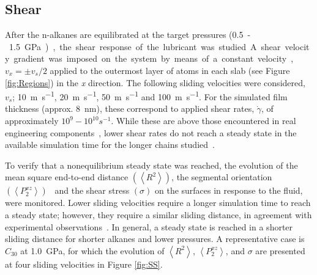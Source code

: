 \documentclass[5p]{elsarticle}
\begin{document}
\subsection{Shear}

After the n-alkanes are equilibrated at the target pressures (\SI{0.5}-\SI{1.5}{\giga\pascal}), the shear response of the lubricant was studied. A shear velocity gradient was imposed on the system by means of a constant velocity, $v_x = \pm v_s/2$ applied to the outermost layer of atoms in each slab (see Figure \ref{fig:Regions}) in the \emph{x} direction. The following sliding velocities were considered, $v_s$; \SI{10}{\meter\per\second}, \SI{20}{\meter\per\second}, \SI{50}{\meter\per\second} and \SI{100}{\meter\per\second}. For the simulated film thickness (approx. \SI{8}{\nano\meter}), these correspond to applied shear rates, $\dot{\gamma}$, of approximately $10^{9} - 10^{10} s^{-1}$. While these are above those encountered in real engineering components~\cite{Taylor2017}, lower shear rates do not reach a steady state in the available simulation time for the longer chains studied~\cite{Ewen2018}.

To verify that a nonequilibrium steady state was reached, the evolution of the mean square end-to-end distance $\left(\left< R^2 \right> \right)$, the segmental orientation $\left(\left<P_{2}^{xz} \right> \right)$~\cite{Erman1985} and the shear stress $\left(\sigma \right)$ on the surfaces in response to the fluid, were monitored. Lower sliding velocities require a longer simulation time to reach a steady state; however, they require a similar sliding distance, in agreement with experimental observations~\cite{Drummond2000}. In general, a steady state is reached in a shorter sliding distance for shorter alkanes and lower pressures. A representative case is $C_{30}$ at \SI{1.0}{\giga\pascal}, for which the evolution of $\left< R^2 \right>$, $\left<P_{2}^{xz} \right>$, and $\sigma$ are presented at four sliding velocities in Figure \ref{fig:SS}.
 
\end{document}
